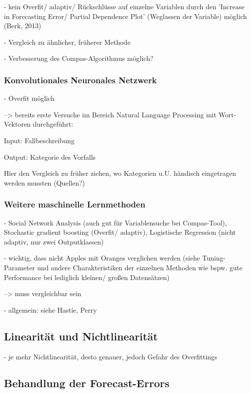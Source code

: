 \documentclass[a4paper,12pt,parskip,bibtotoc,liststotoc]{article}
\begin{document}
- kein Overfit/ adaptiv/ Rückschlüsse auf einzelne Variablen durch den 'Increase in Forecasting Error/ Partial Dependence Plot' (Weglassen der Variable) möglich (Berk, 2013) 

- Vergleich zu ähnlicher, früherer Methode

- Verbesserung des Compas-Algorithmus möglich?

\subsubsection{Konvolutionales Neuronales Netzwerk }  

- Overfit möglich

--> bereits erste Versuche im Bereich Natural Language Processing mit Wort-Vektoren durchgeführt:

Input: 		Fallbeschreibung

Output: 	Kategorie des Vorfalls

Hier den Vergleich zu früher ziehen, wo Kategorien u.U. händisch eingetragen werden mussten (Quellen?)\\


\subsubsection{Weitere maschinelle Lernmethoden}

- Social Network Analysis (auch gut für Variablensuche bei Compas-Tool), Stochastic gradient boosting (Overfit/ adaptiv), Logistische Regression (nicht adaptiv, nur zwei Outputklassen) 

- wichtig, dass nicht Apples mit Oranges verglichen werden (siehe Tuning-Parameter und andere Charakteristiken der einzelnen Methoden wie bspw. gute Performance bei lediglich kleinen/ großen Datensätzen)

--> muss vergleichbar sein

- allgemein: siehe Hastie, Perry


\subsection{Linearität und Nichtlinearität}

- je mehr Nichtlinearität, desto genauer, jedoch Gefahr des Overfittings

\subsection{Behandlung der Forecast-Errors}
\end{document}
